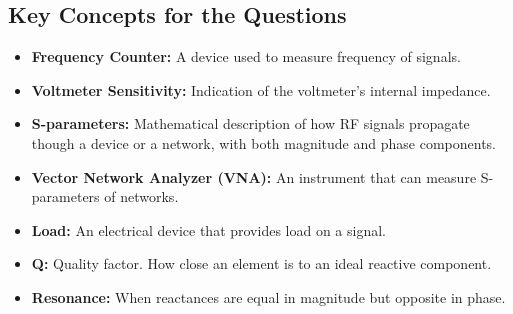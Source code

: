 
\subsection*{Key Concepts for the Questions}
\begin{itemize}
     \item \textbf{Frequency Counter:} A device used to measure frequency of signals.
    \item \textbf{Voltmeter Sensitivity:} Indication of the voltmeter's internal impedance.
       \item \textbf{S-parameters:} Mathematical description of how RF signals propagate though a device or a network, with both magnitude and phase components.
    \item \textbf{Vector Network Analyzer (VNA):} An instrument that can measure S-parameters of networks.
    \item \textbf{Load:} An electrical device that provides load on a signal.
    \item \textbf{Q:} Quality factor. How close an element is to an ideal reactive component.
     \item  \textbf{Resonance:} When reactances are equal in magnitude but opposite in phase.

\end{itemize}

